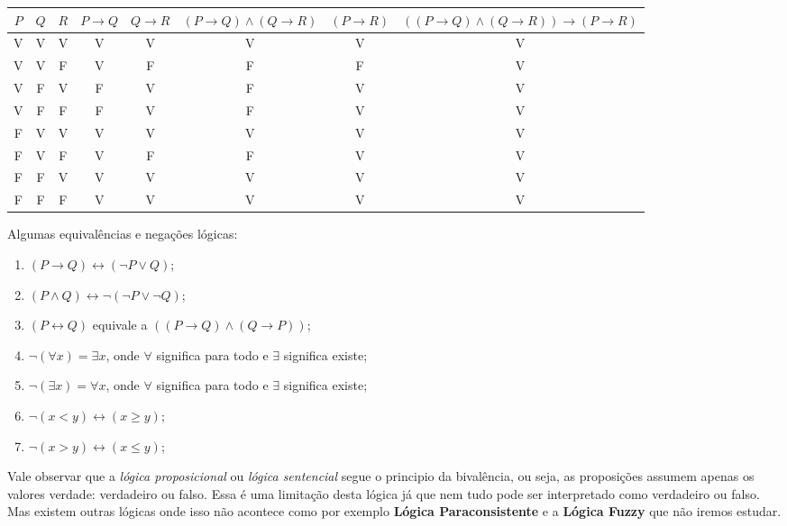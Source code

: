  \vskip0.3cm

 \begin{table}[H]
 \centering
 \begin{tabular}{|c|c|c|c|c|c|c|c|} \hline
 \rowcolor{cinza}
 $P$ & $Q$ & $R$ & $P \rightarrow Q$ & $Q \rightarrow R$ & $(P \rightarrow Q) \land (Q \rightarrow R)$ & $(P \rightarrow R)$ & $((P \rightarrow Q) \land (Q \rightarrow R)) \rightarrow (P \rightarrow R)$\\ \hline
 V & V & V & V & V & V & V & V \\ \hline
 V & V & F & V & F & F & F & V \\ \hline
 V & F & V & F & V & F & V & V \\ \hline
 V & F & F & F & V & F & V & V \\ \hline
 F & V & V & V & V & V & V & V \\ \hline
 F & V & F & V & F & F & V & V \\ \hline
 F & F & V & V & V & V & V & V \\ \hline
 F & F & F & V & V & V & V & V \\ \hline
 \end{tabular}
 \end{table}

 Algumas equivalências e negações lógicas:
 \begin{enumerate}
  \item $(P \rightarrow Q) \leftrightarrow (\neg P \lor Q)$;
  \item $(P \land Q) \leftrightarrow \neg(\neg P \lor \neg Q)$;
  \item $(P \leftrightarrow Q)$ equivale a $((P \rightarrow Q) \land (Q \rightarrow P))$;
  \item $\neg (\forall x)= \exists x$, onde $\forall$ significa para todo e $\exists$ significa existe;
  \item $\neg (\exists x)= \forall x$, onde $\forall$ significa para todo e $\exists$ significa existe;
  \item $\neg (x < y) \leftrightarrow (x \geq y)$;
  \item $\neg (x > y) \leftrightarrow (x \leq y)$;
 \end{enumerate}


 Vale observar que a \emph{lógica proposicional} ou \emph{lógica sentencial} segue o principio da bivalência, ou seja, as proposições assumem apenas os valores verdade: verdadeiro ou falso. Essa é uma limitação desta lógica já que nem tudo pode ser interpretado como verdadeiro ou falso. Mas existem outras lógicas onde isso não acontece como por exemplo \textbf{Lógica Paraconsistente} e a \textbf{Lógica Fuzzy} que não iremos estudar.

